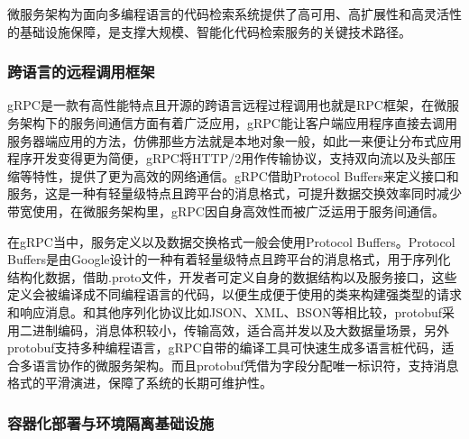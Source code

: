 \documentclass[UTF8,a4paper,12pt]{ctexart}
\numberwithin{equation}{section}
\begin{document}
微服务架构为面向多编程语言的代码检索系统提供了高可用、高扩展性和高灵活性的基础设施保障，是支撑大规模、智能化代码检索服务的关键技术路径。\par

\subsubsection{跨语言的远程调用框架}
gRPC\cite{ref19}是一款有高性能特点且开源的跨语言远程过程调用也就是RPC框架，在微服务架构下的服务间通信方面有着广泛应用，gRPC能让客户端应用程序直接去调用服务器端应用的方法，仿佛那些方法就是本地对象一般，如此一来便让分布式应用程序开发变得更为简便，gRPC将HTTP/2用作传输协议，支持双向流以及头部压缩等特性，提供了更为高效的网络通信。gRPC借助Protocol Buffers来定义接口和服务，这是一种有轻量级特点且跨平台的消息格式，可提升数据交换效率同时减少带宽使用，在微服务架构里，gRPC因自身高效性而被广泛运用于服务间通信。\par
在gRPC当中，服务定义以及数据交换格式一般会使用Protocol Buffers。Protocol Buffers是由Google设计的一种有着轻量级特点且跨平台的消息格式，用于序列化结构化数据，借助.proto文件，开发者可定义自身的数据结构以及服务接口，这些定义会被编译成不同编程语言的代码，以便生成便于使用的类来构建强类型的请求和响应消息。和其他序列化协议比如JSON、XML、BSON等相比较，protobuf采用二进制编码，消息体积较小，传输高效，适合高并发以及大数据量场景，另外protobuf支持多种编程语言，gRPC自带的编译工具可快速生成多语言桩代码，适合多语言协作的微服务架构。而且protobuf凭借为字段分配唯一标识符，支持消息格式的平滑演进，保障了系统的长期可维护性。\par

\subsubsection{容器化部署与环境隔离基础设施}
\end{document}

